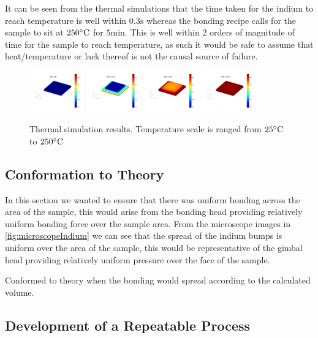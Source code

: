It can be seen from the thermal simulations that the time taken for the indium to reach temperature is well within $0.3 \unit{\second}$ whereas the bonding recipe calls for the sample to sit at $250 \dC$ for $5 \unit{\minute}$. This is well within 2 orders of magnitude of time for the sample to reach temperature, as such it would be safe to assume that heat/temperature or lack thereof is not the causal source of failure.


\begin{figure}
    \centering
    \includegraphics[width=0.21\textwidth]{Main/Ch2/heat/001.png}
    \includegraphics[width=0.21\textwidth]{Main/Ch2/heat/002.png}
    \includegraphics[width=0.21\textwidth]{Main/Ch2/heat/008.png}
    \includegraphics[width=0.21\textwidth]{Main/Ch2/heat/020.png}
    \caption{Thermal simulation results. Temperature scale is ranged from $25 \dC$ to $250 \dC$}
    \label{fig:thermal_simulations}
\end{figure}


\subsection{Conformation to Theory}
In this section we wanted to ensure that there was uniform bonding across the area of the sample, this would arise from the bonding head providing relatively uniform bonding force over the sample area. From the microscope images in \ref{fig:microscopeIndium} we can see that the spread of the indium bumps is uniform over the area of the sample, this would be representative of the gimbal head providing relatively uniform pressure over the face of the sample.

Conformed to theory when the bonding would spread according to the calculated volume.

\subsection{Development of a Repeatable Process}
